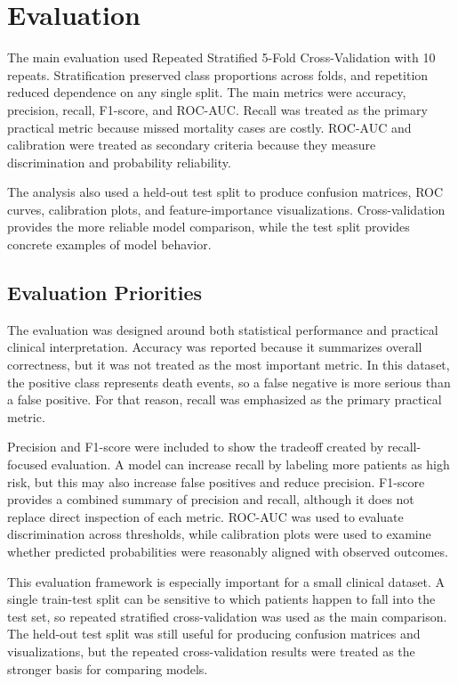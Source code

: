 \documentclass{article}
\begin{document}
\section{Evaluation}

The main evaluation used Repeated Stratified 5-Fold Cross-Validation with 10 repeats. Stratification preserved class proportions across folds, and repetition reduced dependence on any single split. The main metrics were accuracy, precision, recall, F1-score, and ROC-AUC. Recall was treated as the primary practical metric because missed mortality cases are costly. ROC-AUC and calibration were treated as secondary criteria because they measure discrimination and probability reliability.

The analysis also used a held-out test split to produce confusion matrices, ROC curves, calibration plots, and feature-importance visualizations. Cross-validation provides the more reliable model comparison, while the test split provides concrete examples of model behavior.

\subsection{Evaluation Priorities}

The evaluation was designed around both statistical performance and practical clinical interpretation. Accuracy was reported because it summarizes overall correctness, but it was not treated as the most important metric. In this dataset, the positive class represents death events, so a false negative is more serious than a false positive. For that reason, recall was emphasized as the primary practical metric.

Precision and F1-score were included to show the tradeoff created by recall-focused evaluation. A model can increase recall by labeling more patients as high risk, but this may also increase false positives and reduce precision. F1-score provides a combined summary of precision and recall, although it does not replace direct inspection of each metric. ROC-AUC was used to evaluate discrimination across thresholds, while calibration plots were used to examine whether predicted probabilities were reasonably aligned with observed outcomes.

This evaluation framework is especially important for a small clinical dataset. A single train-test split can be sensitive to which patients happen to fall into the test set, so repeated stratified cross-validation was used as the main comparison. The held-out test split was still useful for producing confusion matrices and visualizations, but the repeated cross-validation results were treated as the stronger basis for comparing models.
\end{document}
